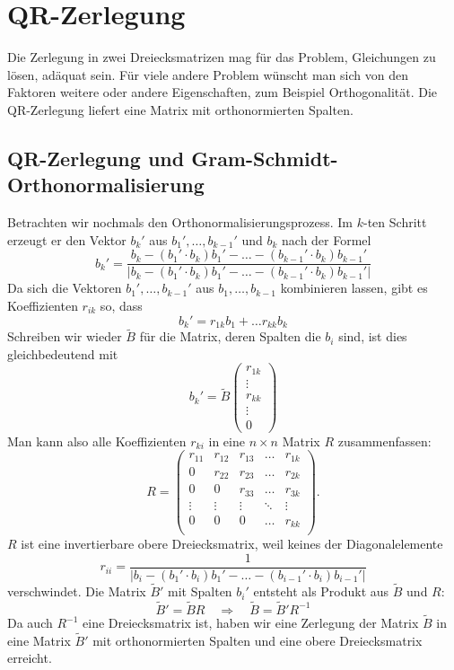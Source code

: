 %
%
%
\section{QR-Zerlegung\label{section-qr}}
Die Zerlegung in zwei Dreiecksmatrizen mag für das Problem, Gleichungen
zu lösen, adäquat sein.
Für viele andere Problem wünscht man
sich von den Faktoren weitere oder andere Eigenschaften, zum Beispiel
Orthogonalität.
Die QR-Zerlegung liefert eine Matrix mit orthonormierten Spalten.

\subsection{QR-Zerlegung und Gram-Schmidt-Orthonormalisierung}
Betrachten wir nochmals den Orthonormalisierungsprozess.
Im $k$-ten Schritt erzeugt er den Vektor $b_k'$ aus $b_1',\dots,b_{k-1}'$
und $b_k$ nach der Formel
\[
b_k'=\frac{
b_k-(b_1'\cdot b_k)b_1'-\dots-(b_{k-1}'\cdot b_k)b_{k-1}'
}{|
b_k-(b_1'\cdot b_k)b_1'-\dots-(b_{k-1}'\cdot b_k)b_{k-1}'
|}
\]
Da sich die Vektoren $b_1',\dots,b_{k-1}'$ aus 
$b_1,\dots,b_{k-1}$ kombinieren lassen, gibt es Koeffizienten $r_{ik}$
so, dass
\[
b_k'=r_{1k}b_1+\dots r_{kk}b_k
\]
Schreiben wir wieder $\tilde B$ für die Matrix, deren Spalten die
$b_i$ sind, ist dies gleichbedeutend mit
\[
b_k'=\tilde B\begin{pmatrix}r_{1k}\\\vdots\\r_{kk}\\\vdots\\0\end{pmatrix}
\]
Man kann also alle Koeffizienten $r_{ki}$ in eine $n\times n$ Matrix $R$
zusammenfassen:
\[
R=\begin{pmatrix}
r_{11}&r_{12}&r_{13}&\dots &r_{1k}\\
0     &r_{22}&r_{23}&\dots &r_{2k}\\
0     &0     &r_{33}&\dots &r_{3k}\\
\vdots&\vdots&\vdots&\ddots&\vdots\\
0     &0     &0     &\dots &r_{kk}\\
\end{pmatrix}.
\]
$R$ ist eine invertierbare
obere Dreiecksmatrix, weil keines der
Diagonalelemente
\[
r_{ii}=\frac1{|
b_i-(b_1'\cdot b_i)b_1'-\dots-(b_{i-1}'\cdot b_i)b_{i-1}'
|}
\]
verschwindet.
Die Matrix $\tilde B'$ mit Spalten $b_i'$ entsteht als Produkt aus $\tilde B$
und $R$:
\[
\tilde B'=\tilde BR
\quad\Rightarrow\quad
\tilde B=\tilde B'R^{-1}
\]
Da auch $R^{-1}$ eine Dreiecksmatrix ist, haben wir eine Zerlegung der
Matrix $\tilde B$ in eine Matrix $\tilde B'$ mit orthonormierten
Spalten und eine obere Dreiecksmatrix erreicht.

